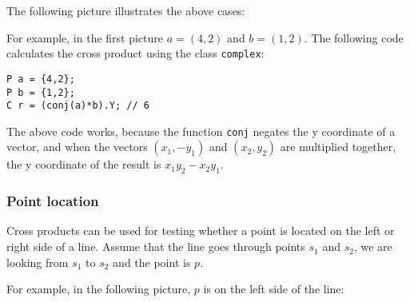 The following picture illustrates the above cases:
\begin{center}
\end{center}

\noindent
For example, in the first picture
$a=(4,2)$ and $b=(1,2)$.
The following code calculates the cross product
using the class \texttt{complex}:

\begin{lstlisting}
P a = {4,2};
P b = {1,2};
C r = (conj(a)*b).Y; // 6
\end{lstlisting}

The above code works, because
the function \texttt{conj} negates the y coordinate
of a vector,
and when the vectors $(x_1,-y_1)$ and $(x_2,y_2)$
are multiplied together, the y coordinate
of the result is $x_1 y_2 - x_2 y_1$.

\subsubsection{Point location}

Cross products can be used for testing
whether a point is located on the left or right
side of a line.
Assume that the line goes through points
$s_1$ and $s_2$, we are looking from $s_1$
to $s_2$ and the point is $p$.

For example, in the following picture,
$p$ is on the left side of the line:
\begin{center}
\end{center}

